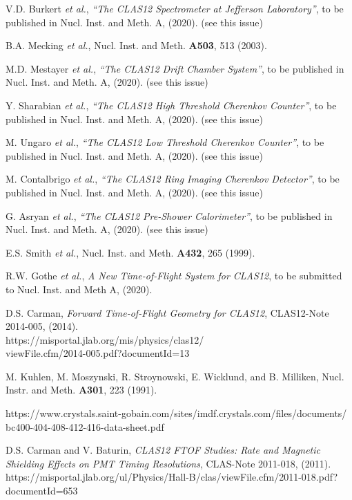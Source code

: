 \documentclass[final,3p,twocolumn]{elsarticle}
\begin{document}
\begin{thebibliography}{99}

V.D. Burkert {\it et al.}, {\it ``The CLAS12 Spectrometer at Jefferson Laboratory''}, to be published in
Nucl. Inst. and Meth. A, (2020). (see this issue)
  
B.A. Mecking {\it et al.}, Nucl. Inst. and Meth. {\bf A503}, 513 (2003).

M.D. Mestayer {\it et al.}, {\it ``The CLAS12 Drift Chamber System''}, to be published in Nucl. Inst.
and Meth. A, (2020). (see this issue)

Y. Sharabian {\it et al.}, {\it ``The CLAS12 High Threshold Cherenkov Counter''}, to be published in Nucl. Inst.
and Meth. A, (2020). (see this issue)
  
M. Ungaro {\it et al.}, {\it ``The CLAS12 Low Threshold Cherenkov Counter''}, to be published in Nucl. Inst.
and Meth. A, (2020). (see this issue)
  
M. Contalbrigo {\it et al.}, {\it ``The CLAS12 Ring Imaging Cherenkov Detector''}, to be published in Nucl. Inst.
and Meth. A, (2020). (see this issue)

G. Asryan {\it et al.}, {\it ``The CLAS12 Pre-Shower Calorimeter''}, to be published in Nucl. Inst.
and Meth. A, (2020). (see this issue)

E.S. Smith {\it et al.}, Nucl. Inst. and Meth. {\bf A432}, 265 (1999).

R.W. Gothe {\it et al.}, {\it A New Time-of-Flight System for CLAS12}, to be submitted to Nucl. Inst.
and Meth A, (2020).

D.S. Carman, {\it Forward Time-of-Flight Geometry for CLAS12}, CLAS12-Note 2014-005, (2014). \\
https://misportal.jlab.org/mis/physics/clas12/\\ viewFile.cfm/2014-005.pdf?documentId=13

M. Kuhlen, M. Moszynski, R. Stroynowski, E. Wicklund, and B. Milliken, Nucl.  Instr. and Meth.
{\bf A301}, 223 (1991).

https://www.crystals.saint-gobain.com/sites/imdf.crystals.com/files/documents/\\
bc400-404-408-412-416-data-sheet.pdf

D.S. Carman and V. Baturin, {\it CLAS12 FTOF Studies: Rate and Magnetic Shielding Effects on PMT Timing
Resolutions}, CLAS-Note 2011-018, (2011).\\
https://misportal.jlab.org/ul/Physics/Hall-B/clas/viewFile.cfm/2011-018.pdf?documentId=653


\end{thebibliography}
\end{document}
